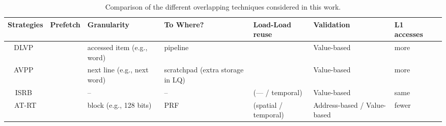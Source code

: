 \documentclass{sig-alternate}
\newcommand{\cmark}{\textcolor{ForestGreen}{\ding{51}}}%
\newcommand{\xmark}{\textcolor{red}{\ding{55}}}%
\begin{document}
\begin{scriptsize}
\begin{table}[h!]
  \centering
  \begin{tabular}{|c|c|p{23mm}|p{23mm}|p{23mm}|p{23mm}|p{23mm}|p{23mm}|}
    \hline
    \textbf{Strategies} & 
    \textbf{Prefetch} & 
    \textbf{Granularity} & 
    \textbf{To Where?} &
    \textbf{Load-Load reuse} & 
    \textbf{Validation} & 
    \textbf{L1 accesses} \\ 
    \hline
    
    \hline
    DLVP~\cite{DLVP/sheikh17} &  \cmark & {\color{orange}accessed \newline item (e.g., word)} & pipeline & \xmark &  {\color{red} Value-based} &  {\color{red} more}     \\
    \hline
    AVPP~\cite{AVPP/orosa18} &  \cmark & {\color{ForestGreen}next line} \newline (e.g., next word) & {\color{red}scratchpad} \newline (extra storage in LQ)  & \xmark & {\color{red} Value-based} &  {\color{red} more}    \\
    \hline
    ISRB~\cite{ISRB/perais16} &  \xmark & -- & -- & \cmark ({\color{red}---} / {\color{ForestGreen}temporal}) & {\color{red} Value-based} &  {\color{black} same}     \\
    \hline
    AT-RT &  \cmark & {\color{ForestGreen}block} \newline (e.g., 128 bits)& PRF & \cmark ({\color{ForestGreen}spatial} / {\color{ForestGreen}temporal}) &  {\color{ForestGreen} Address-based / Value-based} & {\color{ForestGreen} fewer}     \\
    
    \hline

    
    \hline
  \end{tabular}
  \caption{Comparison of the different overlapping techniques considered in this work.}
  \label{table:formatting}
\end{table}
\end{scriptsize}
\end{document}
